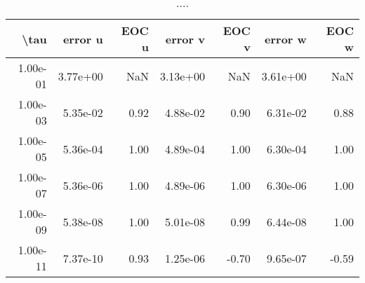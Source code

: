 \begin{table}[ht]
\centering
\begin{tabular}{rrrrrrr}
  \hline
  \textbf{\textbackslash{}tau} & \textbf{error u} & \textbf{EOC u} & \textbf{error v} & \textbf{EOC v} & \textbf{error w} & \textbf{EOC w} \\\hline
  1.00e-01 & 3.77e+00 & NaN & 3.13e+00 & NaN & 3.61e+00 & NaN \\
  1.00e-03 & 5.35e-02 & 0.92 & 4.88e-02 & 0.90 & 6.31e-02 & 0.88 \\
  1.00e-05 & 5.36e-04 & 1.00 & 4.89e-04 & 1.00 & 6.30e-04 & 1.00 \\
  1.00e-07 & 5.36e-06 & 1.00 & 4.89e-06 & 1.00 & 6.30e-06 & 1.00 \\
  1.00e-09 & 5.38e-08 & 1.00 & 5.01e-08 & 0.99 & 6.44e-08 & 1.00 \\
  1.00e-11 & 7.37e-10 & 0.93 & 1.25e-06 & -0.70 & 9.65e-07 & -0.59 \\\hline
\end{tabular}
\caption{....}
\end{table}
